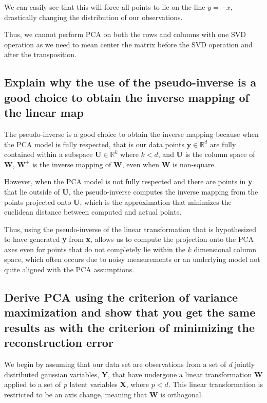\documentclass[11pt,a4paper,landscape]{article}
\begin{document}
We can easily see that this will force all points to lie on the line $ y =  -x $, drastically changing the distribution of our observations.\newline

Thus, we cannot perform PCA on both the rows and columns with one SVD operation as we need to mean center the matrix before the SVD operation and after the transposition.

\subsection{Explain why the use of the pseudo-inverse is a good choice to obtain the inverse mapping of the linear map}

The pseudo-inverse is a good choice to obtain the inverse mapping because when the PCA model is fully respected, that is our data points $\textbf{y} \in \mathbb{R}^d$ are fully contained within a subspace $\textbf{U} \in \mathbb{R}^k$ where $k < d$, and \textbf{U} is the column space of \textbf{W}, $\textbf{W}^{+}$ is the inverse mapping of \textbf{W}, even when \textbf{W} is non-square.\newline

However, when the PCA model is not fully respected and there are points in \textbf{y} that lie outside of \textbf{U}, the pseudo-inverse computes the inverse mapping from the points projected onto \textbf{U}, which is the approximation that minimizes the euclidean distance between computed and actual points\cite{pseudoinverse}.\newline

Thus, using the pseudo-inverse of the linear transformation that is hypothesized to have generated \textbf{y} from \textbf{x}, allows us to compute the projection onto the PCA axes even for points that do not completely lie within the $k$ dimensional column space, which often occurs due to noisy measurements or an underlying model not quite aligned with the PCA assumptions.

\subsection{Derive PCA using the criterion of variance maximization and show that you get the same results as with the criterion of minimizing the reconstruction error}

We begin by assuming that our data set are observations from a set of \textit{d} jointly distributed gaussian variables, \textbf{Y}, that have undergone a linear transformation \textbf{W} applied to a set of \textit{p} latent variables \textbf{X}, where $p < d$. This linear transformation is restricted to be an axis change, meaning that \textbf{W} is orthogonal.\newline
\end{document}
